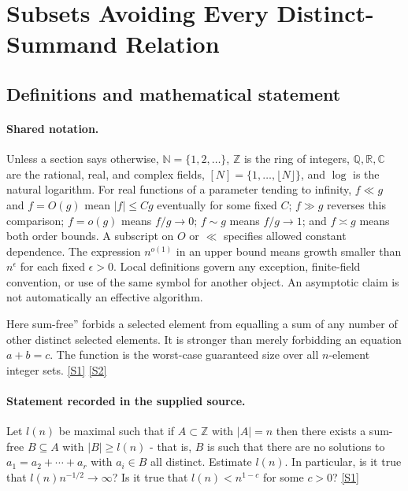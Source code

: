 \documentclass[11pt,a4paper]{article}
\newcommand{\N}{\mathbb{N}}
\newcommand{\Z}{\mathbb{Z}}
\newcommand{\Q}{\mathbb{Q}}
\newcommand{\R}{\mathbb{R}}
\newcommand{\C}{\mathbb{C}}
\newcommand{\sref}[2]{\hyperlink{source:#1:#2}{[S#2]}}
\begin{document}
\section{Subsets Avoiding Every Distinct-Summand Relation}\label{statement}


\subsection{Definitions and mathematical statement}

\paragraph{Shared notation.}Unless a section says otherwise, $\N=\{1,2,\ldots\}$,
$\Z$ is the ring of integers, $\Q,\R,\C$ are the rational, real, and complex
fields, $[N]=\{1,\ldots,\lfloor N\rfloor\}$, and $\log$ is the natural
logarithm. For real functions of a parameter tending to infinity,
$f\ll g$ and $f=O(g)$ mean $|f|\leq Cg$ eventually for some fixed $C$;
$f\gg g$ reverses this comparison; $f=o(g)$ means $f/g\to0$;
$f\sim g$ means $f/g\to1$; and $f\asymp g$ means both order bounds.
A subscript on $O$ or $\ll$ specifies allowed constant dependence.
The expression $n^{o(1)}$ in an upper bound means growth smaller than
$n^\epsilon$ for each fixed $\epsilon>0$. Local definitions govern any
exception, finite-field convention, or use of the same symbol for another
object. An asymptotic claim is not automatically an effective algorithm.



Here sum-free'' forbids a selected element from equalling a sum of any number of other distinct selected elements. It is stronger than merely forbidding an equation $a+b=c$. The function is the worst-case guaranteed size over all $n$-element integer sets. \sref{statement}{1} \sref{statement}{2}

\paragraph{Statement recorded in the supplied source.}
Let $l(n)$ be maximal such that if $A\subset\mathbb{Z}$ with $\lvert A\rvert=n$ then there exists a sum-free $B\subseteq A$ with $\lvert B\rvert \geq l(n)$ - that is, $B$ is such that there are no solutions to $ a_1=a_2+\cdots+a_r $ with $a_i\in B$ all distinct.
Estimate $l(n)$. In particular, is it true that $l(n)n^{-1/2}\to \infty$? Is it true that $l(n)< n^{1-c}$ for some $c>0$? \sref{statement}{1}
\end{document}
